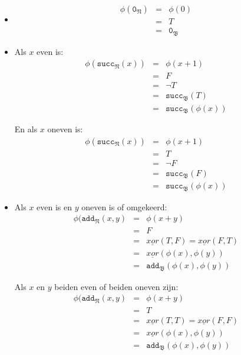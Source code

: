 \documentclass[a4paper,11pt]{article}
\begin{document}
\begin{enumerate}
\begin{itemize}
\item
\begin{eqnarray*}
\phi(\texttt{0}_{\mathfrak{N}}) & = & \phi(0) \\
                                & = & T \\
                                & = & \texttt{0}_{\mathfrak{B}}
\end{eqnarray*}

\item
Als $x$ even is:
\begin{eqnarray*}
\phi(\texttt{succ}_{\mathfrak{N}}(x)) & = & \phi(x+1) \\
                                      & = & F \\
                                      & = & \neg T \\
                                      & = & \texttt{succ}_{\mathfrak{B}}(T) \\
                                      & = & \texttt{succ}_{\mathfrak{B}}(\phi(x))
\end{eqnarray*}

En als $x$ oneven is:
\begin{eqnarray*}
\phi(\texttt{succ}_{\mathfrak{N}}(x)) & = & \phi(x+1) \\
                                      & = & T \\
                                      & = & \neg F \\
                                      & = & \texttt{succ}_{\mathfrak{B}}(F) \\
                                      & = & \texttt{succ}_{\mathfrak{B}}(\phi(x))
\end{eqnarray*}

\item
Als $x$ even is en $y$ oneven is of omgekeerd:
\begin{eqnarray*}
\phi(\texttt{add}_{\mathfrak{N}}(x,y) & = & \phi(x+y) \\
                                      & = & F \\
                                      & = & \underline{xor}(T, F) = \underline{xor}(F, T) \\
                                      & = & \underline{xor}(\phi(x), \phi(y)) \\
                                      & = & \texttt{add}_{\mathfrak{B}}(\phi(x),\phi(y))
\end{eqnarray*}

Als $x$ en $y$ beiden even of beiden oneven zijn:
\begin{eqnarray*}
\phi(\texttt{add}_{\mathfrak{N}}(x,y) & = & \phi(x+y) \\
                                      & = & T \\
                                      & = & \underline{xor}(T, T) = \underline{xor}(F, F) \\
                                      & = & \underline{xor}(\phi(x), \phi(y)) \\
                                      & = & \texttt{add}_{\mathfrak{B}}(\phi(x),\phi(y))
\end{eqnarray*}


\end{itemize}
\end{enumerate}
\end{document}
